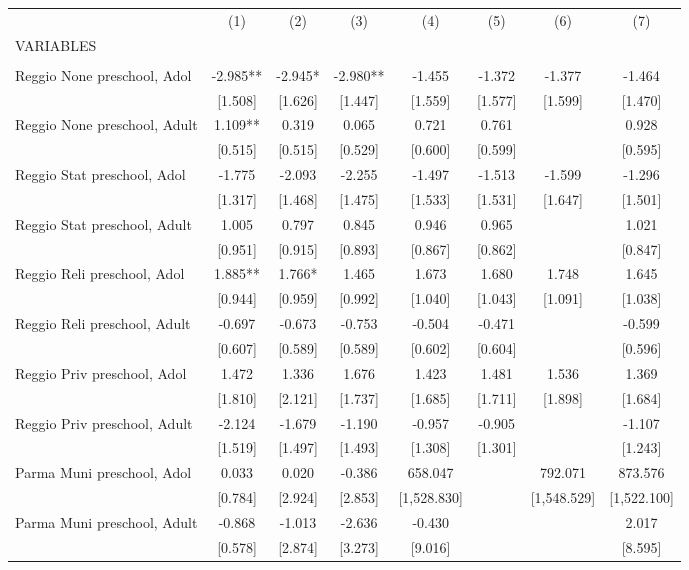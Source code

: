 \begin{tabular}{lccccccc} \hline
 & (1) & (2) & (3) & (4) & (5) & (6) & (7) \\
VARIABLES &  &  &  &  &  &  &  \\ \hline
 &  &  &  &  &  &  &  \\
Reggio None preschool, Adol & -2.985** & -2.945* & -2.980** & -1.455 & -1.372 & -1.377 & -1.464 \\
 & [1.508] & [1.626] & [1.447] & [1.559] & [1.577] & [1.599] & [1.470] \\
Reggio None preschool, Adult & 1.109** & 0.319 & 0.065 & 0.721 & 0.761 &  & 0.928 \\
 & [0.515] & [0.515] & [0.529] & [0.600] & [0.599] &  & [0.595] \\
Reggio Stat preschool, Adol & -1.775 & -2.093 & -2.255 & -1.497 & -1.513 & -1.599 & -1.296 \\
 & [1.317] & [1.468] & [1.475] & [1.533] & [1.531] & [1.647] & [1.501] \\
Reggio Stat preschool, Adult & 1.005 & 0.797 & 0.845 & 0.946 & 0.965 &  & 1.021 \\
 & [0.951] & [0.915] & [0.893] & [0.867] & [0.862] &  & [0.847] \\
Reggio Reli preschool, Adol & 1.885** & 1.766* & 1.465 & 1.673 & 1.680 & 1.748 & 1.645 \\
 & [0.944] & [0.959] & [0.992] & [1.040] & [1.043] & [1.091] & [1.038] \\
Reggio Reli preschool, Adult & -0.697 & -0.673 & -0.753 & -0.504 & -0.471 &  & -0.599 \\
 & [0.607] & [0.589] & [0.589] & [0.602] & [0.604] &  & [0.596] \\
Reggio Priv preschool, Adol & 1.472 & 1.336 & 1.676 & 1.423 & 1.481 & 1.536 & 1.369 \\
 & [1.810] & [2.121] & [1.737] & [1.685] & [1.711] & [1.898] & [1.684] \\
Reggio Priv preschool, Adult & -2.124 & -1.679 & -1.190 & -0.957 & -0.905 &  & -1.107 \\
 & [1.519] & [1.497] & [1.493] & [1.308] & [1.301] &  & [1.243] \\
Parma Muni preschool, Adol & 0.033 & 0.020 & -0.386 & 658.047 &  & 792.071 & 873.576 \\
 & [0.784] & [2.924] & [2.853] & [1,528.830] &  & [1,548.529] & [1,522.100] \\
Parma Muni preschool, Adult & -0.868 & -1.013 & -2.636 & -0.430 &  &  & 2.017 \\
 & [0.578] & [2.874] & [3.273] & [9.016] &  &  & [8.595] \\

\end{tabular}
